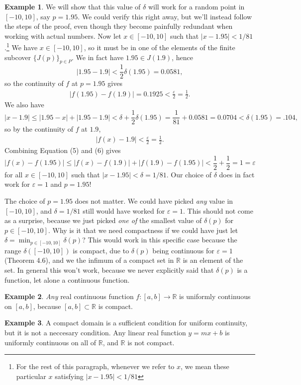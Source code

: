 \documentclass{article}
\newcommand{\R}{\mathbb{R}}
\theoremstyle{definition}
\newtheorem{example}{Example}[section]
\begin{document}
\begin{example}
	 We will show that this value of $ \delta $ will work for a random point in $ [-10,10] $, say $ p=1.95 $. We could verify this right away, but we'll instead follow the steps of the proof, even though they become painfully redundant when working with actual numbers.  Now let $ x\in[-10,10] $ such that $ |x-1.95|<1/81 $.\footnote{For the rest of this paragraph, whenever we refer to $ x $, we mean these particular $ x $ satisfying  $ |x-1.95|<1/81 $} We have $ x\in[-10,10] $, so it must be in one of the elements of the finite subcover $ \{J(p)\}_{p\in P} $. We in fact have $ 1.95\in J(1.9) $, hence $$ |1.95-1.9|<\frac{1}{2}\delta(1.95)=0.0581 ,$$so the continuity of $ f $ at $ p=1.95 $ gives
	 \begin{align}
	 |f(1.95)-f(1.9)|=0.1925<\frac{\varepsilon}{2}=\frac{1}{2}.
	 \end{align}
	 We also have $$|x-1.9|\le|1.95-x|+|1.95-1.9|<\delta+\frac{1}{2}\delta(1.95)=\frac{1}{81}+0.0581=0.0704<\delta(1.95)=.104,  $$ so by the continuity of $ f $ at $ 1.9 $, 
	 \begin{align}
	 	|f(x)-1.9|<\frac{\varepsilon}{2}=\frac{1}{2}.
	 \end{align}
	 Combining Equation (5) and (6)	gives $$|f(x)-f(1.95)|\le|f(x)-f(1.9)|+|f(1.9)-f(1.95)|<\frac{1}{2}+\frac{1}{2}=1=\varepsilon $$ for all $ x\in[-10,10] $ such that $ |x-1.95|<\delta=1/81 $. Our choice of $ \delta $ does in fact work for $ \varepsilon=1 $ and $ p=1.95 $! 
	 
	 The choice of $ p=1.95 $ does not matter. We could have picked \textit{any} value in $ [-10,10] $, and $ \delta=1/81 $ still would have worked for $ \varepsilon=1 $. This should not come as a surprise, because we just picked \textit{one of} the smallest value of $ \delta(p) $ for $ p\in[-10,10] $. Why is it that we need compactness if we could have just let $ \delta=\min_{p\in[-10,10]}\delta(p) $? This would work in this specific case because the range $ \delta([-10,10]) $ is compact, due to $ \delta(p) $ being continuous for $ \varepsilon=1 $ (Theorem 4.6), and we the infimum of a compact set in $ \R $ is an element of the set. In general this won't work, because we never explicitly said that $ \delta(p) $ is a function, let alone a continuous function.  
\end{example}
\begin{example}
	\textit{Any} real continuous function $ f:[a,b]\to\R $ is uniformly continuous on $ [a,b] $, because $ [a,b]\subset\R $ is compact. 
\end{example}  
\begin{example}
	A compact domain is a sufficient condition for uniform continuity, but it is not a neccesary condition. Any linear real function $ y=mx+b $ is uniformly continuous on all of $ \R $, and $ \R $ is not compact. 
\end{example}
\end{document}
